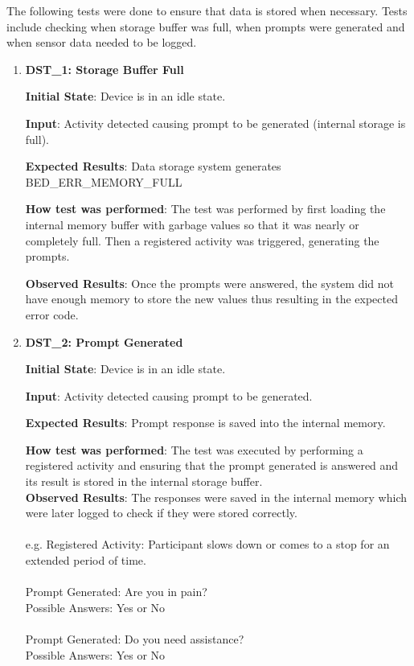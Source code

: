 \documentclass[12pt, titlepage]{article}
\begin{document}
The following tests were done to ensure that data is stored when necessary. Tests include checking when storage buffer was full, when prompts were generated and when sensor data needed to be logged.
\begin{enumerate}
  \item{\textbf{DST\_1: Storage Buffer Full} \\}\label{DST1}

  \textbf{Initial State}: Device is in an idle state.

  \textbf{Input}: Activity detected causing prompt to be generated (internal storage is full).

  \textbf{Expected Results}: Data storage system generates BED\_ERR\_MEMORY\_FULL

  \textbf{How test was performed}: The test was performed by first loading the internal memory buffer with garbage values so that it was nearly or completely full. Then a registered activity was triggered, generating the prompts.

  \textbf{Observed Results}:  Once the prompts were answered, the system did not have enough memory to store the new values thus resulting in the expected error code.


  \item{\textbf{DST\_2: Prompt Generated} \\}\label{DST2}

  \textbf{Initial State}: Device is in an idle state.

  \textbf{Input}: Activity detected causing prompt to be generated.

  \textbf{Expected Results}: Prompt response is saved into the internal memory.

  \textbf{How test was performed}: The test was executed by performing a registered activity and ensuring that the prompt generated is answered and its result is stored in the internal storage buffer.\\

  \textbf{Observed Results}: The responses were saved in the internal memory which were later logged to check if they were stored correctly.\\
\\
  e.g. Registered Activity: Participant slows down or comes to a stop for an extended period of time.\\
\\
  Prompt Generated: Are you in pain?\\
  Possible Answers: Yes or No\\
  \\
  Prompt Generated: Do you need assistance?\\
  Possible Answers: Yes or No\\


\end{enumerate}
\end{document}
